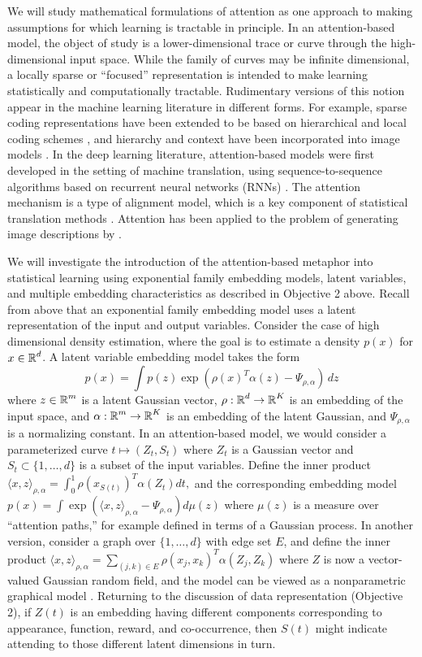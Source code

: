 We will study mathematical formulations of attention as one approach
to making assumptions for which learning is tractable in principle.
In an attention-based model, the object of study is a
lower-dimensional trace or curve through the high-dimensional input
space. While the family of curves may be infinite dimensional, a
locally sparse or ``focused'' representation is intended to make
learning statistically and computationally tractable. Rudimentary
versions of this notion appear in the machine learning literature in
different forms.  For example, sparse coding representations have
been extended to be based on hierarchical and local coding schemes
\citep{WangYYLHG10,YuLL11}, and hierarchy and context have been 
incorporated into image models \citep{ChangJZBG11,JinG06}. In the
deep learning literature, attention-based models were first developed
in the setting of machine translation, using sequence-to-sequence
algorithms based on recurrent neural networks
(RNNs) \citep{bahdanau2014}. The attention mechanism is a type of
alignment model, which is a key component of statistical translation
methods \citep{Brown1993}. Attention has been applied to the problem of generating image
descriptions by \cite{showtell}.

We will investigate the introduction of the attention-based metaphor into
statistical learning using exponential family embedding models, latent
variables, and multiple embedding characteristics as described in
Objective 2 above. 
Recall from above that an exponential family embedding model uses a
latent representation of the input and output variables. Consider the
case of high dimensional density estimation, where the goal is to
estimate a density $p(x)$ for $x\in\mbox{$\mathbb{R}$}^d$.  A latent variable
embedding model takes the form
$$ p(x) = \int p(z) \exp(\rho(x)^T \alpha(z) - \Psi_{\rho,\alpha}) \, dz$$
where $z\in \mbox{$\mathbb{R}$}^m$ is a latent Gaussian vector,
$\rho:\mbox{$\mathbb{R}$}^d \to \mbox{$\mathbb{R}$}^K$ is an embedding of the input space,
and $\alpha: \mbox{$\mathbb{R}$}^m \to\mbox{$\mathbb{R}$}^K$ is an embedding of the latent
Gaussian, and $\Psi_{\rho,\alpha}$ is a normalizing constant.
In an attention-based model, we would consider a parameterized curve $t\mapsto (Z_t, S_t)$
where $Z_t$ is a Gaussian vector and $S_t \subset \{1,\ldots, d\}$
is a subset of the input variables. Define the inner product 
$\langle x, z\rangle_{\rho,\alpha}
= \int_{0}^1 \rho\left(x_{S(t)}\right)^T \alpha(Z_t) dt,$
and the corresponding embedding model
$ p(x) = \int \exp\left(\langle x, z\rangle_{\rho,\alpha} - \Psi_{\rho,\alpha}\right) d\mu(z)$ where $\mu(z)$ is a 
measure over ``attention paths,'' for example defined in terms of a Gaussian process.
In another version, consider a graph over $\{1,\ldots, d\}$ with edge
set $E$, and define the inner product
$\langle x, z\rangle_{\rho,\alpha}
= \sum_{(j,k)\in E} \rho(x_j, x_k)^T \alpha(Z_j, Z_k)$
where $Z$ is now a vector-valued Gaussian random field, 
and the model can be viewed as a nonparametric graphical model
\citep{hl18}. Returning to the discussion of data representation (Objective 2), 
if $Z(t)$ is an embedding having different components corresponding
to appearance, function, reward, and co-occurrence, then $S(t)$ might 
indicate attending to those different latent dimensions in turn.

